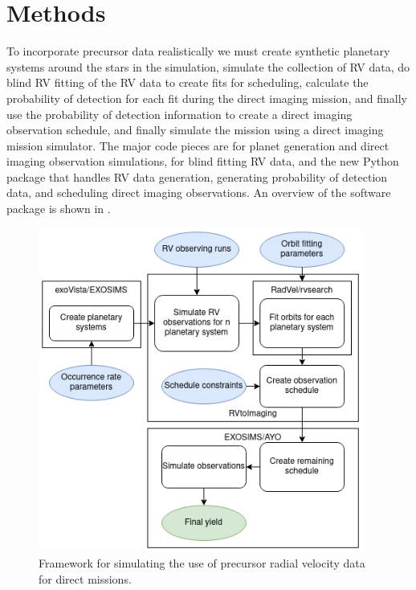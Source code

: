 \section{Methods}
To incorporate precursor data realistically we must create synthetic planetary
systems around the stars in the simulation, simulate the collection of RV data,
do blind RV fitting of the RV data to create fits for scheduling, calculate the
probability of detection for each fit during the direct imaging mission, and
finally use the probability of detection information to create a direct imaging
observation schedule, and finally simulate the mission using a direct imaging
mission simulator. The major code pieces are  for planet
generation and direct imaging observation simulations,  for
blind fitting RV data, and the new Python package  that
handles RV data generation, generating probability of detection data, and
scheduling direct imaging observations. An overview of the software package is
shown in .

\begin{figure}
  \begin{center}
    \includegraphics[width=0.95\textwidth]{ch4/figures/flowchartwhite.png}
  \end{center}
  \caption{Framework for simulating the use of precursor radial velocity data
  for direct missions.}
  \label{fig:rv2imgflowchart}
\end{figure}

